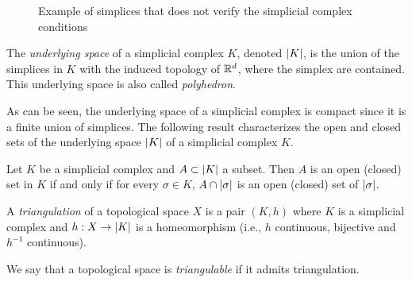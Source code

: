 \documentclass[../main.tex]{subfiles}
\begin{document}
\begin{figure}[ht]
\centering
{}
\caption{Example of simplices that does not verify the simplicial complex conditions}
\label{fig:noComp}
\end{figure}

\begin{definition}
The \emph{underlying space} of a simplicial complex $K$, denoted $\left\lvert K \right\rvert$, is the union of the simplices in $K$ with the induced topology of $\mathbb{R}^d$, where the simplex are contained. This underlying space is also called \emph{polyhedron}.
\end{definition}
As can be seen, the underlying space of a simplicial complex is compact since it is a finite union of simplices. The following result characterizes the open and closed sets of the underlying space $\left\lvert K \right\rvert$ of a simplicial complex $K$.

\begin{proposition}
Let $K$ be a simplicial complex and $A \subset \left\lvert K \right\rvert$ a subset. Then $A$ is an open (closed) set in $K$ if and only if for every $\sigma \in K$, $A \cap \left\lvert \sigma \right\rvert$ is an open (closed) set of $\left\lvert \sigma \right\rvert$.
\end{proposition}

\begin{definition}
A \emph{triangulation} of a topological space $X$ is a pair $(K, h)$ where $K$ is a simplicial complex and $h: X \to \left\lvert K \right\rvert$ is a homeomorphism (i.e., $h $ continuous, bijective and $h^{-1}$ continuous).
\end{definition}
We say that a topological space is \emph{triangulable} if it admits triangulation.\\
\end{document}
